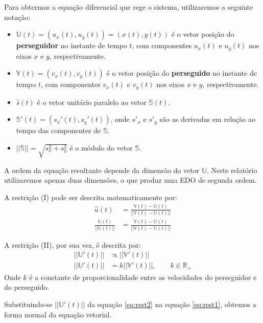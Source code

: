 \documentclass[a4paper,10pt]{article}
\begin{document}
  Para obtermos a equação diferencial que rege o sistema, utilizaremos a seguinte notação:
  \begin{itemize}
   \item $\mathbb{U}(t) = (u_{x}(t), u_{y}(t)) = (x(t), y(t))$ é o vetor posição do \textbf{perseguidor} no instante de tempo $t$, com componentes $u_{x}(t)$ e $u_{y}(t)$ nos eixos $x$ e $y$, respectivamente.
   
   \item $\mathbb{V}(t) = (v_{x}(t), v_{y}(t))$ é o vetor posição do \textbf{perseguido} no instante de tempo $t$, com componentes $v_{x}(t)$ e $v_{y}(t)$ nos eixos $x$ e $y$, respectivamente.
   
   \item $\widehat{s}(t)$ é o vetor unitário paralelo ao vetor $\mathbb{S}(t)$.
   
   \item $\mathbb{S}'(t) = (s_{x}'(t), s_{y}'(t))$, onde $s'_{x}$ e $s'_{y}$ são as derivadas em relação ao tempo das componentes de $\mathbb{S}$.
   
   \item $||\mathbb{S}|| = \sqrt{s_{x}^2 + s_{y}^2}$ é o módulo do vetor $\mathbb{S}$.
   
  \end{itemize}

  A ordem da equação resultante depende da dimensão do vetor $\mathbb{U}$. Neste relatório utilizaremos apenas duas dimensões, o que produz uma EDO de segunda ordem.
  
  A restrição (I) pode ser descrita matematicamente por:
  \begin{align}
   \widehat{u}(t) &= \frac{\mathbb{V}(t) - \mathbb{U}(t)}{|| \mathbb{V}(t) - \mathbb{U}(t) ||}
   \\  
   \frac{\mathbb{U}(t)}{||\mathbb{U}(t)||} &= \frac{\mathbb{V}(t) - \mathbb{U}(t)}{|| \mathbb{V}(t) - \mathbb{U}(t) ||}
   \label{eq:rest1}
  \end{align}
  
  A restrição (II), por sua vez, é descrita por:
  \begin{align}
   ||\mathbb{U}'(t)|| &\propto ||\mathbb{V}'(t)||
   \\
   ||\mathbb{U}'(t)|| &= k ||\mathbb{V}'(t)||, \qquad k \in \mathbb{R}_+
   \label{eq:rest2}
  \end{align}
  Onde $k$ é a constante de proporcionalidade entre as velocidades do perseguidor e do perseguido.
  
  Substituindo-se $||\mathbb{U}'(t)||$ da equação \ref{eq:rest2} na equação \ref{eq:rest1}, obtemos a forma normal da equação vetorial.
  
\end{document}
